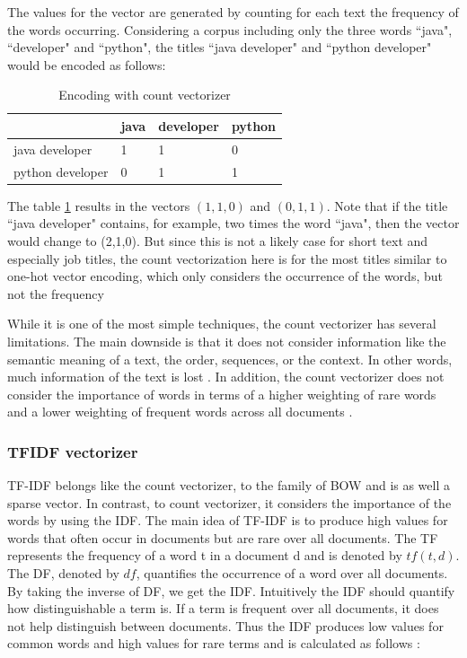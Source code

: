 \documentclass[12pt, a4paper, titlepage]{article}
\begin{document}
The values for the vector are generated by counting for each text the frequency of the words occurring. Considering a corpus including only the three words ``java", ``developer" and ``python", the titles ``java developer" and ``python developer" would be encoded as follows:


\begin{table}[hb!]
\center
  \begin{tabular}{llll}
  \hline
                   & java & developer & python \\ \hline
  java developer   & 1    & 1         & 0      \\
  python developer & 0    & 1         & 1      \\ \hline
  \end{tabular}
  \caption{\label{tab: T11} Encoding with count vectorizer}
  \end{table}


  The table \ref{tab: T11} results in the vectors $(1,1,0)$ and $(0,1,1)$. Note that if the title ``java developer" contains, for example, two times the word ``java", then the vector would change to (2,1,0). But since this is not a likely case for short text and especially job titles, the count vectorization here is for the most titles similar to one-hot vector encoding, which only considers the occurrence of the words, but not the frequency \citep{kulkarni2021, sarkar2016}

  While it is one of the most simple techniques, the count vectorizer has several limitations. The main downside is that it does not consider information like the semantic meaning of a text, the order, sequences, or the context. In other words, much information of the text is lost \citep{sarkar2016}. In addition, the count vectorizer does not consider the importance of words in terms of a higher weighting of rare words and a lower weighting of frequent words across all documents \citep{suleymanov2019}.

\subsubsection*{TFIDF vectorizer}
\ac{TF-IDF} belongs like the count vectorizer, to the family of \ac{BOW} and is as well a sparse vector. In contrast, to count vectorizer, it considers the importance of the words by using the \ac{IDF}. The main idea of \ac{TF-IDF} is to produce high values for words that often occur in documents but are rare over all documents. The \ac{TF} represents the frequency of a word t in a document d and is denoted by $tf(t,d)$. The \ac{DF}, denoted by $df$, quantifies the occurrence of a word over all documents. By taking the inverse of \ac{DF}, we get the \ac{IDF}. Intuitively the \ac{IDF} should quantify how distinguishable a term is. If a term is frequent over all documents, it does not help distinguish between documents. Thus the \ac{IDF} produces low values for common words and high values for rare terms and is calculated as follows \citep{sidorov2019, kuang2010}: 
\end{document}
